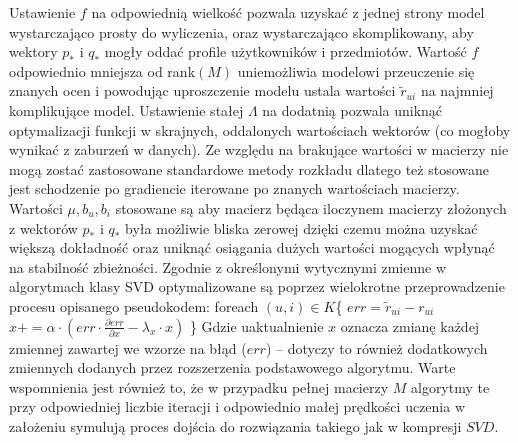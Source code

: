 \documentclass{pracamgr}
\begin{document}
     Ustawienie $f$ na odpowiednią wielkość pozwala uzyskać z jednej strony model wystarczająco prosty do wyliczenia,
     oraz wystarczająco skomplikowany, aby wektory $p_*$ i $q_*$ mogły oddać profile użytkowników i przedmiotów.
     Wartość $f$ odpowiednio mniejsza od rank$(M)$ uniemożliwia modelowi przeuczenie się znanych ocen i powodując uproszczenie modelu
     ustala wartości $\tilde{r}_{ui}$ na najmniej komplikujące model.
     Ustawienie stałej $\Lambda$ na dodatnią pozwala uniknąć optymalizacji funkcji w skrajnych, oddalonych wartościach wektorów
     (co mogłoby wynikać z zaburzeń w danych).\newline
     Ze względu na brakujące wartości w macierzy nie mogą zostać zastosowane standardowe metody rozkładu dlatego też stosowane jest
     schodzenie po gradiencie iterowane po znanych wartościach macierzy.
     Wartości $\mu,b_u,b_i$ stosowane są aby macierz będąca iloczynem macierzy złożonych z wektorów $p_*$ i $q_*$ była możliwie bliska zerowej
     dzięki czemu można uzyskać większą dokładność oraz uniknąć osiągania dużych wartości mogących wpłynąć na stabilność zbieżności.\newline
     Zgodnie z określonymi wytycznymi zmienne w algorytmach klasy SVD optymalizowane są
     poprzez wielokrotne przeprowadzenie procesu opisanego pseudokodem:\newline\newline
     \hspace*{16pt}	foreach $(u,i)\in K$\{\newline
     \hspace*{32pt}		$err=\tilde{r}_{ui}-r_{ui}$\newline
     \hspace*{32pt}		$x+=\alpha\cdot(err\cdot\frac{\partial err}{\partial x}-\lambda_{x}\cdot x)$\newline
     \hspace*{16pt}	\}\newline    
     Gdzie uaktualnienie $x$ oznacza zmianę każdej zmiennej zawartej we wzorze na błąd ($err$) -- dotyczy to również dodatkowych zmiennych dodanych
     przez rozszerzenia podstawowego algorytmu.\newline
     Warte wspomnienia jest również to, że w przypadku pełnej macierzy $M$ algorytmy te przy odpowiedniej liczbie iteracji i odpowiednio małej
     prędkości uczenia w założeniu symulują proces dojścia do rozwiązania takiego jak w kompresji $SVD$.
\end{document}
